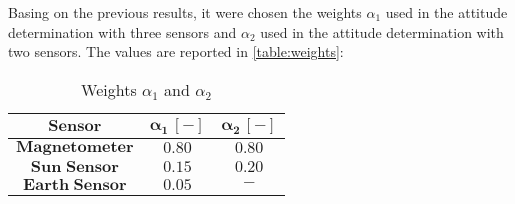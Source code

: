 Basing on the previous results, it were chosen the weights $\alpha_1$ used in the attitude determination with three sensors and $\alpha_2$ used in the attitude determination with two sensors. The values are reported in \autoref{table:weights}:

\begin{table}[H]

    \centering
    \begin{tabular}{|c|c|c|}
    \hline
    $\bm{Sensor}$ & $\bm{\alpha_{1}\, [-]}$ & $\bm{\alpha_{2} \, [-]}$ \\
    \hline
    $\bm{Magnetometer}$ & $0.80$ & $0.80$  \\
    \hline
    $\bm{Sun\;Sensor}$ & $0.15$ & $0.20$  \\
    \hline
    $\bm{Earth\;Sensor}$ & $0.05$ & $\bm{-}$  \\
    \hline
    \end{tabular}
    
    \caption{Weights $\alpha_{1}$ and $\alpha_{2}$}
    \label{table:weights}
    
\end{table}
